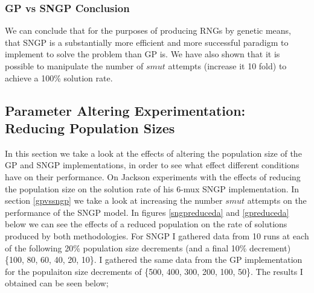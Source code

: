 \documentclass[a4paper,10.5pt]{article}
\begin{document}
\subsubsection{GP vs SNGP Conclusion}
We can conclude that for the purposes of producing RNGs by genetic means, that SNGP is a substantially more efficient and more successful paradigm to implement to solve the problem than GP is. We have also shown that it is possible to manipulate the number of $smut$ attempts (increase it 10 fold) to achieve a 100\% solution rate.

\newpage
\subsection{Parameter Altering Experimentation: Reducing Population Sizes}
In this section we take a look at the effects of altering the population size of the GP and SNGP implementations, in order to see what effect different conditions have on their performance. On \cite[p.56]{jacksonsngp} Jackson experiments with the effects of reducing the population size on the solution rate of his 6-mux SNGP implementation. In section \ref{gpvssngp} we take a look at increasing the number $smut$ attempts on the performance of the SNGP model. In figures \ref{sngpreduceda} and \ref{gpreduceda} below we can see the effects of a reduced population on the rate of solutions produced by both methodologies. For SNGP I gathered data from 10 runs at each of the following 20\% population size decrements (and a final 10\% decrement) \{100, 80, 60, 40, 20, 10\}. I gathered the same data from the GP implementation for the populaiton size decrements of \{500, 400, 300, 200, 100, 50\}. The results I obtained can be seen below;
\end{document}
